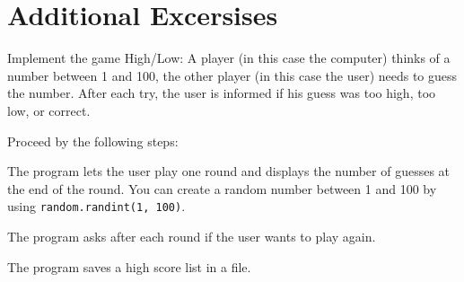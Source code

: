 \section*{Additional Excersises}

\begin{aufgabe}
Implement the game High/Low: A player (in this case the computer) thinks of a number between 1 and 100, the other player (in this case the user) needs to guess the number. After each try, the user is informed if his guess was too high, too low, or correct.

Proceed by the following steps:
\begin{teilaufgabe}
The program lets the user play one round and displays the number of guesses at the end of the round.
\hinweis You can create a random number between 1 and 100 by using \lstinline{random.randint(1, 100)}.
\end{teilaufgabe}
\begin{teilaufgabe}
The program asks after each round if the user wants to play again.
\end{teilaufgabe}
\begin{teilaufgabe}
The program saves a high score list in a file.
\end{teilaufgabe}

\end{aufgabe}


